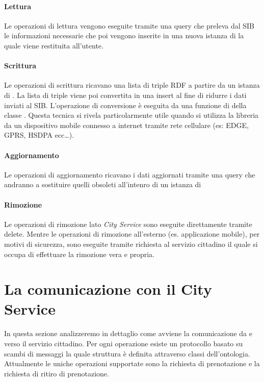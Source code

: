 \paragraph{Lettura} Le operazioni di lettura vengono eseguite tramite una query  che preleva dal SIB le informazioni necessarie che poi vengono inserite in una nuova istanza di  la quale viene restituita all'utente.

\paragraph{Scrittura} Le operazioni di scrittura ricavano una lista di triple RDF a partire da un istanza di . La lista di triple viene poi convertita in una  insert al fine di ridurre i dati inviati al SIB. L'operazione di conversione è eseguita da una funzione di della  classe . Questa tecnica si rivela particolarmente utile quando si utilizza la libreria da un dispositivo mobile connesso a internet tramite rete cellulare (es: EDGE, GPRS, HSDPA ecc\dots).

\paragraph{Aggiornamento} Le operazioni di aggiornamento ricavano i dati aggiornati tramite una query  che andranno a sostituire quelli obsoleti all'intenro di un istanza di 

\paragraph{Rimozione} Le operazioni di rimozione lato \emph{City Service} sono eseguite direttamente tramite  delete. Mentre le operazioni di rimozione all'esterno (es. applicazione mobile), per motivi di sicurezza, sono eseguite tramite richiesta al servizio cittadino il quale si occupa di effettuare la rimozione vera e propria.

\section{La comunicazione con il City Service}\label{sec:protocol}

In questa sezione analizzeremo in dettaglio come avviene la comunicazione da e verso il servizio cittadino. Per ogni operazione esiste un protocollo basato su scambi di messaggi la quale struttura è definita attraverso classi dell'ontologia. Attualmente le uniche operazioni supportate sono la richiesta di prenotazione e la richiesta di ritiro di prenotazione.

